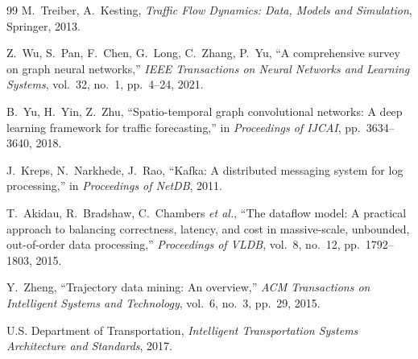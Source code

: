 \begin{thebibliography}{99}
M.~Treiber, A.~Kesting,
\textit{Traffic Flow Dynamics: Data, Models and Simulation},
Springer, 2013.

Z.~Wu, S.~Pan, F.~Chen, G.~Long, C.~Zhang, P.~Yu,
``A comprehensive survey on graph neural networks,''
\textit{IEEE Transactions on Neural Networks and Learning Systems},
vol.~32, no.~1, pp.~4--24, 2021.

B.~Yu, H.~Yin, Z.~Zhu,
``Spatio-temporal graph convolutional networks: A deep learning framework for traffic forecasting,''
in \textit{Proceedings of IJCAI},
pp.~3634--3640, 2018.

J.~Kreps, N.~Narkhede, J.~Rao,
``Kafka: A distributed messaging system for log processing,''
in \textit{Proceedings of NetDB},
2011.

T.~Akidau, R.~Bradshaw, C.~Chambers \textit{et al.},
``The dataflow model: A practical approach to balancing correctness, latency, and cost in massive-scale, unbounded, out-of-order data processing,''
\textit{Proceedings of VLDB},
vol.~8, no.~12, pp.~1792--1803, 2015.

Y.~Zheng,
``Trajectory data mining: An overview,''
\textit{ACM Transactions on Intelligent Systems and Technology},
vol.~6, no.~3, pp.~29, 2015.

U.S. Department of Transportation,
\textit{Intelligent Transportation Systems Architecture and Standards},
2017.

\end{thebibliography}
